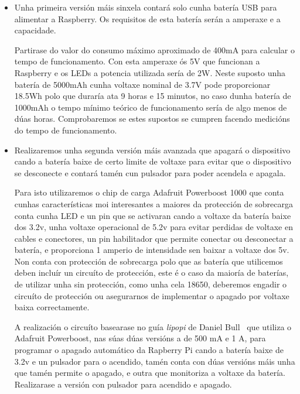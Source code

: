 \begin{itemize}
    \item Unha primeira versión máis sinxela contará solo cunha batería USB para alimentar a Raspberry. Os requisitos de esta batería serán a amperaxe e a capacidade.

    Partirase do valor do consumo máximo aproximado de 400mA para calcular o tempo de funcionamento. Con esta amperaxe ós 5V que funcionan a Raspberry e os LEDs a potencia utilizada sería de 2W. Neste suposto unha batería de  5000mAh cunha voltaxe nominal de 3.7V pode proporcionar 18.5Wh polo que duraría ata 9 horas e 15 minutos, no caso dunha batería de 1000mAh o tempo mínimo teórico de funcionamento sería de algo menos de dúas horas.
    Comprobaremos se estes supostos se cumpren facendo medicións do tempo de funcionamento.

    \item Realizaremos unha segunda versión máis avanzada que apagará o dispositivo cando a batería baixe de certo limite de voltaxe para evitar que o dispositivo se desconecte e contará tamén cun pulsador para poder acendela e apagala.

    Para isto utilizaremos o chip de carga Adafruit Powerboost 1000 que conta cunhas características moi interesantes a maiores da protección de sobrecarga conta cunha LED e un pin que se activaran cando a voltaxe da batería baixe dos 3.2v, unha voltaxe operacional de 5.2v para evitar perdidas de voltaxe en cables e conectores, un pin habilitador que permite conectar ou desconectar a batería, e proporciona 1 amperio de intensidade sen baixar a voltaxe dos 5v. Non conta con protección de sobrecarga polo que as batería que utilicemos deben incluír un circuíto de protección, este é o caso da maioría de baterías, de utilizar unha sin protección, como unha cela 18650, deberemos engadir o circuíto de protección ou asegurarnos de implementar o apagado por voltaxe baixa correctamente.

    A realización o circuíto basearase no guía \emph{lipopi} de Daniel Bull~\cite{bullGuideSettingLiPo2019} que utiliza o Adafruit Powerboost, nas súas dúas versións a de 500 mA e 1 A, para programar o apagado automático da Rapberry Pi cando a batería baixe de 3.2v e un pulsador para o acendido, tamén conta con dúas versións máis unha que tamén permite o apagado, e outra que monitoriza a voltaxe da batería. Realizarase a versión con pulsador para acendido e apagado.


\end{itemize}
